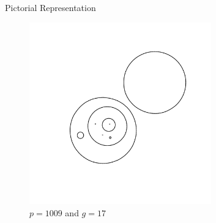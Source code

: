 \begin{frame}{Pictorial Representation}
    \begin{figure}
        \centering
        \includegraphics[width=0.7\textwidth]{figures/graph_0011_1009.pdf}
        \caption{$p = 1009$ and $g = 17$}
        \label{fig:smiley}
    \end{figure}
\end{frame}


